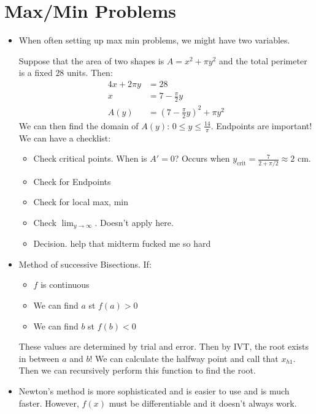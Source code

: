 \section{Max/Min Problems}
\begin{itemize}
    \item When often setting up max min problems, we might have two variables.
    \begin{example}
        Suppose that the area of two shapes is $A=x^2+\pi y^2$ and the total perimeter is a fixed $28$ units. Then:
        \begin{align}
            4x+2\pi y &= 28 \\
            x &= 7 - \frac{\pi}{2}y \\ 
            A(y) &= \left(7-\frac{\pi}{2}y\right)^2+\pi y^2
        \end{align}
        We can then find the domain of $A(y)$: $0 \le y \le \frac{14}{\pi}$. Endpoints are important! We can have a checklist:
        \begin{itemize}
            \item Check critical points. When is $A'=0$? Occurs when $y_\text{crit} = \frac{7}{2+\pi/2} \approx 2\text{ cm}.$
            \item Check for Endpoints
            \item Check for local max, min
            \item Check $\lim_{y\to\infty}$. Doesn't apply here.
            \item Decision. \small{help that midterm fucked me so hard}
        \end{itemize}
    \end{example}
    \item Method of successive Bisections. If:
    \begin{itemize}
        \item $f$ is continuous
        \item We can find $a$ st $f(a)>0$
        \item We can find $b$ st $f(b)<0$
    \end{itemize}
    These values are determined by trial and error. Then by IVT, the root exists in between $a$ and $b$! We can calculate the halfway point and call that $x_{h1}$. Then we can recursively perform this function to find the root.
    \item Newton's method is more sophisticated and is easier to use and is much faster. However, $f(x)$ must be differentiable and it doesn't always work.
    \begin{itemize}

\end{itemize}
\end{itemize}
